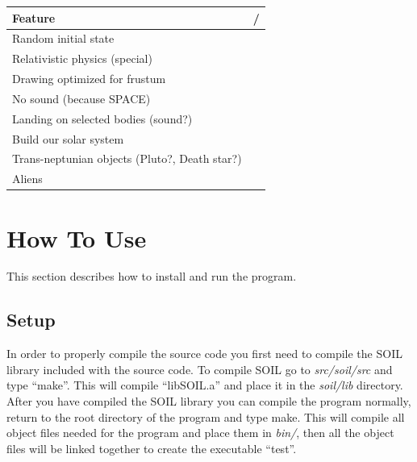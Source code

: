 \documentclass[a4paper,12pt]{article}
\newcommand{\cmark}{\ding{51}}%
\newcommand{\xmark}{\ding{55}}%
\begin{document}
\begin{center}
        \begin{tabular}[h]{|l|c|}
                \hline
                \textbf{Feature} & \cmark/\xmark \\
                \hline
                Random initial state & \cmark \\
                Relativistic physics (special) & \xmark \\
                Drawing optimized for frustum & \cmark \\
                No sound (because SPACE) & \cmark \\
                Landing on selected bodies (sound?) & \xmark \\
                Build our solar system & \cmark \\
                Trans-neptunian objects (Pluto?, Death star?) & \xmark \\
                Aliens & \xmark \\
                \hline
        \end{tabular}
\end{center}

\section{How To Use}
This section describes how to install and run the program.
\subsection{Setup}
In order to properly compile the source code you first need to compile the SOIL
library included with the source code. To compile SOIL go to
\emph{src/soil/src} and type ``make''. This will compile ``libSOIL.a'' and
place it in the \emph{soil/lib} directory. After you have compiled the SOIL
library you can compile the program normally, return to the root directory of
the program and type make. This will compile all object files needed for the
program and place them in \emph{bin/}, then all the object files will be linked
together to create the executable ``test''.
\end{document}
